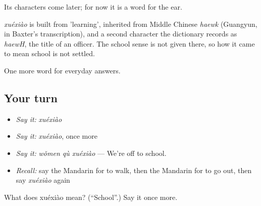 Its characters come later; for now it is a word for the ear.

\begin{cousinweb}
\emph{xuéxiào} is built from  'learning', inherited from Middle Chinese \emph{haewk} (Guangyun, in Baxter's transcription), and a second character the dictionary records as \emph{haewH}, the title of an officer. The school sense is not given there, so how it came to mean school is not settled.
\end{cousinweb}

\begin{grammarlens}[title={What you've built}]
One more word for everyday answers.
\end{grammarlens}

\subsection*{Your turn}
\begin{itemize}
\raggedright
  \item \emph{Say it:} \emph{xuéxiào}
  \item \emph{Say it:} \emph{xuéxiào}, once more
  \item \emph{Say it:} \emph{wǒmen qù xuéxiào} — We're off to school.
  \item \emph{Recall:} say the Mandarin for to walk, then the Mandarin for to go out, then say \emph{xuéxiào} again
\end{itemize}

\begin{tcolorbox}[breakable,colback=teal!4,colframe=teal!35!black,title={Before you move on}]
What does xuéxiào mean? (\textquotedblleft{}School\textquotedblright{}.) Say it once more.
\end{tcolorbox}
